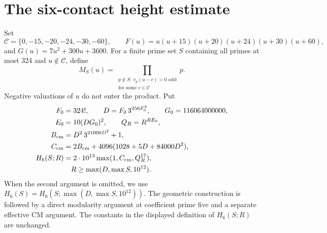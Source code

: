 \documentclass[11pt]{article}
\theoremstyle{definition}
\theoremstyle{remark}
\newcommand{\Cset}{\mathcal C}
\begin{document}


\section{The six-contact height estimate}\label{sec:height}
Set
\[
 \Cset=\{0,-15,-20,-24,-30,-60\},\qquad
 F(u)=u(u+15)(u+20)(u+24)(u+30)(u+60),
\]
and $G(u)=7u^2+300u+3600$. For a finite prime set $S$ containing all
primes at most 324 and $u\notin\Cset$, define
\[
 M_S(u)=\prod_{\substack{p\notin S:\ v_p(u-c)>0\text{ odd}\\
                          \text{for some }c\in\Cset}}p.
\]
Negative valuations of $u$ do not enter the product. Put
\begin{align*}
 F_0&=324!,\qquad D=F_0\,3^{256F_0^4},\qquad G_0=116064000000,\\
 E_0&=10(DG_0)^2,\qquad Q_R=R^{RE_0},\\
 B_{\rm cm}&=D^2\,3^{21000D^2}+1,\\
 C_{\rm cm}&=2B_{\rm cm}+4096(1028+5D+84000D^2),\\
 H_6(S;R)&=2\cdot10^{13}\max(1,C_{\rm cm},Q_R^{17}),\\
 &\hspace{1em}R\ge\max(D,\max S,10^{12}).
\end{align*}
When the second argument is omitted, we use
$H_6(S)=H_6(S;\max(D,\max S,10^{12}))$.
The geometric construction is followed by a direct modularity argument
at coefficient prime five and a separate effective CM argument. The
constants in the displayed definition of $H_6(S;R)$ are unchanged.
\end{document}
